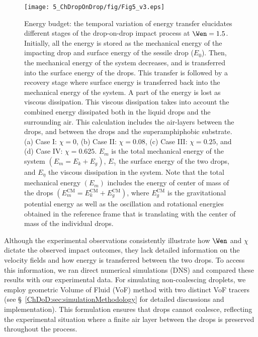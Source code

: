 \begin{figure}
	\centering
	\texttt{[image: 5\_ChDropOnDrop/fig/Fig5\_v3.eps]}
	\caption{Energy budget: the temporal variation of energy transfer elucidates different stages of the drop-on-drop impact process at $\Wen = 1.5$. Initially, all the energy is stored as the mechanical energy of the impacting drop and surface energy of the sessile drop ($E_0$). Then, the mechanical energy of the system decreases, and is transferred into the surface energy of the drops. This transfer is followed by a recovery stage where surface energy is transferred back into the mechanical energy of the system. A part of the energy is lost as viscous dissipation. This viscous dissipation takes into account the combined energy dissipated both in the liquid drops and the surrounding air. This calculation includes the air-layers between the drops, and between the drops and the superamphiphobic substrate. (a) Case I: $\chi = 0$, (b) Case II: $\chi = 0.08$, (c) Case III: $\chi = 0.25$, and (d) Case IV: $\chi = 0.625$. $E_m$ is the total mechanical energy of the system $\left(E_m = E_k + E_g\right)$, $E_\gamma$ the surface energy of the two drops, and $E_\eta$ the viscous dissipation in the system. Note that the total mechanical energy $\left(E_m\right)$ includes the energy of center of mass of the drops $\left(E_m^{\text{CM}} = E_k^{\text{CM}} + E_g^{\text{CM}}\right)$, where $E_g^{\text{CM}}$ is the gravitational potential energy as well as the oscillation and rotational energies obtained in the reference frame that is translating with the center of mass of the individual drops.}
	\label{ChDoD:fig5}
\end{figure}

Although the experimental observations consistently illustrate how $\Wen$ and $\chi$ dictate the observed impact outcomes, they lack detailed information on the velocity fields and how energy is transferred between the two drops. To access this information, we ran direct numerical simulations (DNS) and compared these results with our experimental data. For simulating non-coalescing droplets, we employ geometric Volume of Fluid (VoF) \citep{popinet2009accurate, basiliskpopinet1} method with two distinct VoF tracers (see \S~\ref{ChDoD:sec:simulationMethodology} for detailed discussions and implementation). This formulation ensures that drops cannot coalesce, reflecting the experimental situation where a finite air layer between the drops is preserved throughout the process.

